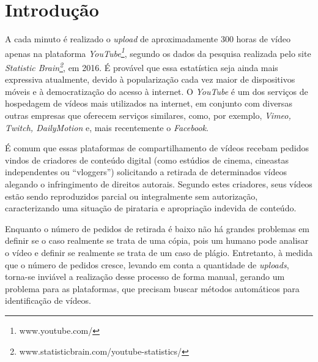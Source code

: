 \chapter{Introdução}
\label{chap:introducao}

A cada minuto é realizado o \textit{upload} de aproximadamente 300 horas de vídeo apenas na plataforma \textit{YouTube\footnote{www.youtube.com/}}, segundo os dados da pesquisa realizada pelo site \textit{Statistic Brain\footnote{www.statisticbrain.com/youtube-statistics/}}, em 2016. É provável que essa estatística seja ainda mais expressiva atualmente, devido à popularização cada vez maior de dispositivos móveis e à democratização do acesso à internet. O \textit{YouTube} é um dos serviços de hospedagem de vídeos mais utilizados na internet, em conjunto com diversas outras empresas que oferecem serviços similares, como, por exemplo, \textit{Vimeo, Twitch, DailyMotion} e, mais recentemente o \textit{Facebook}.

É comum que essas plataformas de compartilhamento de vídeos recebam pedidos vindos de criadores de conteúdo digital (como estúdios de cinema, cineastas independentes ou ``vloggers'') solicitando a retirada de determinados vídeos alegando o infringimento de direitos autorais. Segundo estes criadores, seus vídeos estão sendo reproduzidos parcial ou integralmente sem autorização, caracterizando uma situação de pirataria e apropriação indevida de conteúdo. 

Enquanto o número de pedidos de retirada é baixo não há grandes problemas em definir se o caso realmente se trata de uma cópia, pois um humano pode analisar o vídeo e definir se realmente se trata de um caso de plágio. Entretanto, à medida que o número de pedidos cresce, levando em conta a quantidade de \textit{uploads}, torna-se inviável a realização desse processo de forma manual, gerando um problema para as plataformas, que precisam buscar métodos automáticos para identificação de vídeos.

